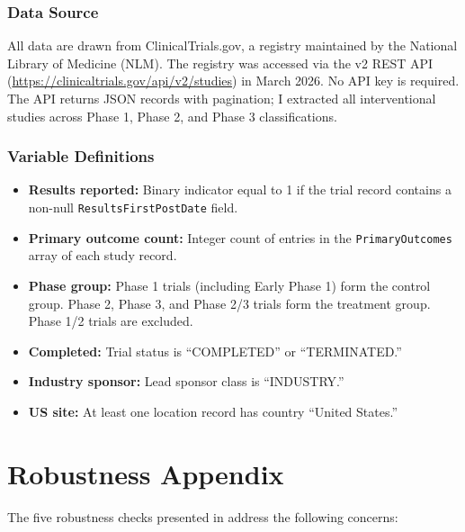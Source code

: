\documentclass[12pt]{article}
\begin{document}
\subsubsection*{Data Source} All data are drawn from ClinicalTrials.gov, a registry maintained by the National Library of Medicine (NLM). The registry was accessed via the v2 REST API (\url{https://clinicaltrials.gov/api/v2/studies}) in March 2026. No API key is required. The API returns JSON records with pagination; I extracted all interventional studies across Phase 1, Phase 2, and Phase 3 classifications.

\subsubsection*{Variable Definitions}
\begin{itemize}
\item \textbf{Results reported:} Binary indicator equal to 1 if the trial record contains a non-null \texttt{ResultsFirstPostDate} field.
\item \textbf{Primary outcome count:} Integer count of entries in the \texttt{PrimaryOutcomes} array of each study record.
\item \textbf{Phase group:} Phase 1 trials (including Early Phase 1) form the control group. Phase 2, Phase 3, and Phase 2/3 trials form the treatment group. Phase 1/2 trials are excluded.
\item \textbf{Completed:} Trial status is ``COMPLETED'' or ``TERMINATED.''
\item \textbf{Industry sponsor:} Lead sponsor class is ``INDUSTRY.''
\item \textbf{US site:} At least one location record has country ``United States.''
\end{itemize}

\section{Robustness Appendix}
\label{sec:robust_appendix}

The five robustness checks presented in  address the following concerns:
\end{document}
